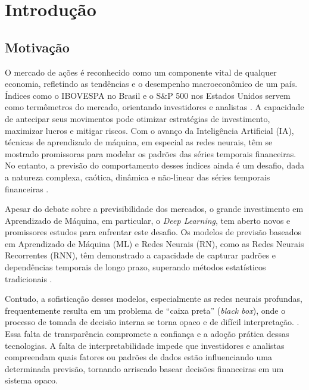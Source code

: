 \chapter[Introdução]{Introdução}

\section{Motivação}

O mercado de ações é reconhecido como um componente vital de qualquer economia, refletindo as tendências e o desempenho macroeconômico de um país. Índices como o IBOVESPA no Brasil e o S\&P 500 nos Estados Unidos servem como termômetros do mercado, orientando investidores e analistas \cite{Ferro2024AvaliacaoEnsemble}. A capacidade de antecipar seus movimentos pode otimizar estratégias de investimento, maximizar lucros e mitigar riscos. Com o avanço da Inteligência Artificial (IA), técnicas de aprendizado de máquina, em especial as redes neurais, têm se mostrado promissoras para modelar os padrões das séries temporais financeiras. No entanto, a previsão do comportamento desses índices ainda é um desafio, dada a natureza complexa, caótica, dinâmica e não-linear das séries temporais financeiras \cite{Ferro2024AvaliacaoEnsemble, Nelson2017UsoRedes}.

Apesar do debate sobre a previsibilidade dos mercados, o grande investimento em Aprendizado de Máquina, em particular, o \textit{Deep Learning}, tem aberto novos e promissores estudos para enfrentar este desafio. Os modelos de previsão baseados em Aprendizado de Máquina (ML) e Redes Neurais (RN), como as Redes Neurais Recorrentes (RNN), têm demonstrado a capacidade de capturar padrões e dependências temporais de longo prazo, superando métodos estatísticos tradicionais \cite{Nelson2017UsoRedes}.

Contudo, a sofisticação desses modelos, especialmente as redes neurais profundas, frequentemente resulta em um problema de ``caixa preta'' (\textit{black box}), onde o processo de tomada de decisão interna se torna opaco e de difícil interpretação. \cite{Ayatollahi2025XAIStockCrashes}. Essa falta de transparência compromete a confiança e a adoção prática dessas tecnologias. A falta de interpretabilidade impede que investidores e analistas compreendam quais fatores ou padrões de dados estão influenciando uma determinada previsão, tornando arriscado basear decisões financeiras em um sistema opaco. \cite{Gupta2025Interpretable}

